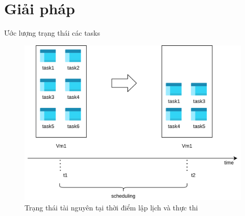 \documentclass[11pt,xcolor={dvipsnames}, aspectratio=169]{beamer}
\begin{document}

\section{Giải pháp} 

\begin{frame}
{Ước lượng trạng thái các tasks}
\begin{figure}
	\centering
	\includegraphics[scale=0.5]{images/predicting_status1.png}
	\caption{Trạng thái tài nguyên tại thời điểm lập lịch và thực thi}
\end{figure}
\end{frame}

\end{document}
